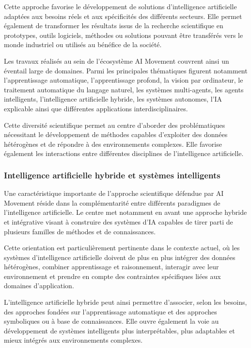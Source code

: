 \documentclass[12pt,a4paper]{report}
\begin{document}
Cette approche favorise le développement de solutions d'intelligence artificielle adaptées aux besoins réels et aux spécificités des différents secteurs. Elle permet également de transformer les résultats issus de la recherche scientifique en prototypes, outils logiciels, méthodes ou solutions pouvant être transférés vers le monde industriel ou utilisés au bénéfice de la société.

Les travaux réalisés au sein de l'écosystème AI Movement couvrent ainsi un éventail large de domaines. Parmi les principales thématiques figurent notamment l'apprentissage automatique, l'apprentissage profond, la vision par ordinateur, le traitement automatique du langage naturel, les systèmes multi-agents, les agents intelligents, l'intelligence artificielle hybride, les systèmes autonomes, l'IA explicable ainsi que différentes applications interdisciplinaires.

Cette diversité scientifique permet au centre d'aborder des problématiques nécessitant le développement de méthodes capables d'exploiter des données hétérogènes et de répondre à des environnements complexes. Elle favorise également les interactions entre différentes disciplines de l'intelligence artificielle.

\subsubsection{Intelligence artificielle hybride et systèmes intelligents}

Une caractéristique importante de l'approche scientifique défendue par AI Movement réside dans la complémentarité entre différents paradigmes de l'intelligence artificielle. Le centre met notamment en avant une approche hybride et intégrative visant à construire des systèmes d'IA capables de tirer parti de plusieurs familles de méthodes et de connaissances.

Cette orientation est particulièrement pertinente dans le contexte actuel, où les systèmes d'intelligence artificielle doivent de plus en plus intégrer des données hétérogènes, combiner apprentissage et raisonnement, interagir avec leur environnement et prendre en compte des contraintes spécifiques liées aux domaines d'application.

L'intelligence artificielle hybride peut ainsi permettre d'associer, selon les besoins, des approches fondées sur l'apprentissage automatique et des approches symboliques ou à base de connaissances. Elle ouvre également la voie au développement de systèmes intelligents plus interprétables, plus adaptables et mieux intégrés aux environnements complexes.
\end{document}
